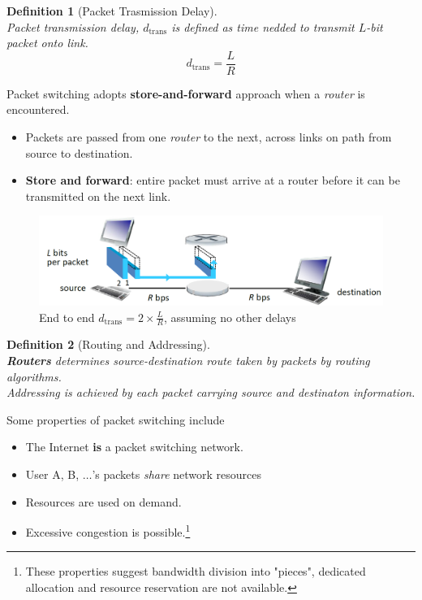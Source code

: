 \documentclass[12pt]{article}
\newtheorem{definition}{Definition}[section]
\theoremstyle{definition}
\begin{document}
\begin{definition}[Packet Trasmission Delay]
\hfill\\\normalfont Packet transmission delay, $d_{\text{trans}}$ is defined as time nedded to transmit $L$-bit packet onto link.
\[
d_{\text{trans}} = \frac{L}{R}
\]
\end{definition}
Packet switching adopts \textbf{store-and-forward} approach when a \textit{router} is encountered.
\begin{itemize}
  \item Packets are passed from one \textit{router} to the next, across links on path from source to destination.
  \item \textbf{Store and forward}: entire packet must arrive at a router before it can be transmitted on the next link.
\end{itemize}
\begin{figure}[h]
\includegraphics[width = \textwidth]{1_3_2.png}
\caption{End to end $d_{\text{trans}} = 2\times\frac{L}{R}$, assuming no other delays}
\end{figure}
\begin{definition}[Routing and Addressing]
\hfill\\\normalfont \textbf{Routers} determines source-destination route taken by packets by routing algorithms.\\
Addressing is achieved by each packet carrying source and destinaton information.
\end{definition}
Some properties of packet switching include
\begin{itemize}
  \item The Internet \textbf{is} a packet switching network.
  \item User A, B, $\ldots$'s packets \textit{share} network resources
  \item Resources are used on demand.
  \item Excessive congestion is possible.\footnote{These properties suggest bandwidth division into "pieces", dedicated allocation and resource reservation are not available.}
\end{itemize} 
\end{document}
